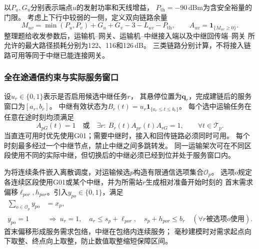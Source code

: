 以$P_u,G_u$分别表示端点$u$的发射功率和天线增益，
$P_{\mathrm{th}}=-90$\,dBm为含安全裕量的门限。
考虑上下行中较弱的一侧，定义双向链路余量
\begin{equation}
 M_{uv}=\min(P_u,P_v)+G_u+G_v-3-L_{uv}-P_{\mathrm{th}},\qquad
 A_{uv}=\mathbf 1_{\{M_{uv}\ge0\}}.
 \label{eq:q3-linkmargin}
\end{equation}
整理题给收发参数后，运输机--网关、运输机--中继接入端以及中继回传端--网关
所允许的最大路径损耗分别为122、116和126\,dB。
三类链路分别计算，不将接入链路可用等同于中继已能连接网关。

\subsubsection{全在途通信约束与实际服务窗口}
设$u_r\in\{0,1\}$表示是否启用候选中继任务$r$，
其悬停位置为$\boldsymbol q_r$，完成建链后的服务窗口为$[a_r,b_r]$。
中继有效状态为$B_r(t)=u_r\mathbf1_{\{a_r\le t\le b_r\}}$。
每个选中运输任务在任意在途时刻均须满足
\begin{equation}
 A_{pG}(t)=1\quad\text{或}\quad
 \exists r:\ B_r(t)A_{pr}(t)A_{rG}=1,
 \qquad \forall t\in\mathcal T_p.
 \label{eq:q3-continuous}
\end{equation}
当直连可用时优先使用G01；需要中继时，接入和回传链路必须同时可用。
每个时刻最多经过一个中继节点，禁止中继之间多跳转发。
同一运输架次可在不同区段使用不同的实际中继，但切换后的中继必须已经到位并处于服务窗口内。

为将连续条件嵌入离散调度，对运输候选$p$构造有限通信选项集合$\mathcal O_p$。
选项$o$规定各连续区段使用G01或某个中继，并为所需站$r$生成相对准备开始时刻的
首末需求偏移$\ell_{por},h_{por}$。引入$y_{po}\in\{0,1\}$，满足
\begin{align}
 \sum_{o\in\mathcal O_p}y_{po}&=x_p, \label{eq:q3-option}\\
 y_{po}=1&\ \Longrightarrow\ 
 u_r=1,\quad a_r\le s_p+\ell_{por},\quad
 s_p+h_{por}\le b_r\quad(\forall r\text{被选项}o\text{使用}).
 \label{eq:q3-servicewindow}
\end{align}
首末偏移形成服务需求包络，中继在包络内连续服务；
毫秒建模时对需求起点向下取整、终点向上取整，防止数值取整缩短保障区间。

